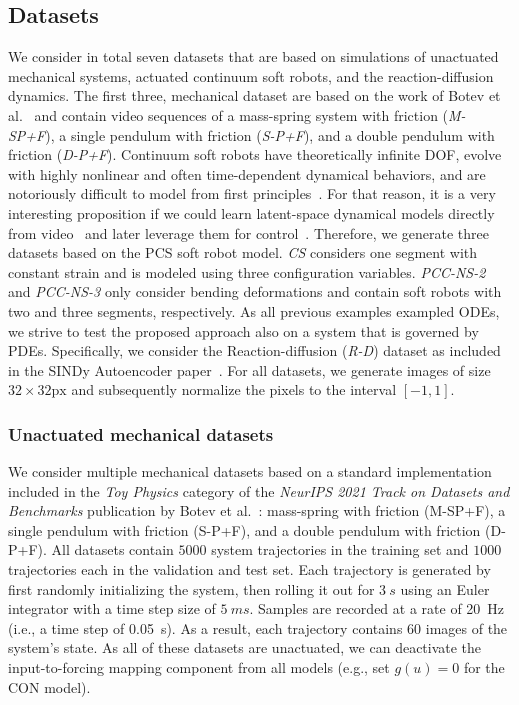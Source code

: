 \subsection{Datasets} 
We consider in total seven datasets that are based on simulations of unactuated mechanical systems, actuated continuum soft robots, and the reaction-diffusion dynamics. The first three, mechanical dataset are based on the work of Botev et al.~\cite{botev2021priors} and contain video sequences of a mass-spring system with friction (\emph{M-SP+F}), a single pendulum with friction (\emph{S-P+F}), and a double pendulum with friction (\emph{D-P+F}).
Continuum soft robots have theoretically infinite \gls{DOF}, evolve with highly nonlinear and often time-dependent dynamical behaviors, and are notoriously difficult to model from first principles~\cite{armanini2023soft}. For that reason, it is a very interesting proposition if we could learn latent-space dynamical models directly from video~\cite{thuruthel2023multi} and later leverage them for control~\cite{almanzor2023static}. 
Therefore, we generate three datasets based on the \gls{PCS} soft robot model. \emph{CS} considers one segment with constant strain and is modeled using three configuration variables. \emph{PCC-NS-2} and \emph{PCC-NS-3} only consider bending deformations and contain soft robots with two and three segments, respectively. 
As all previous examples exampled \glspl{ODE}, we strive to test the proposed approach also on a system that is governed by \glspl{PDE}. Specifically, we consider the Reaction-diffusion (\emph{R-D}) dataset as included in the SINDy Autoencoder paper~\cite{champion2019data}.
For all datasets, we generate images of size $32 \times 32 \mathrm{px}$ and subsequently normalize the pixels to the interval $[-1, 1]$. 

\subsubsection{Unactuated mechanical datasets}
We consider multiple mechanical datasets based on a standard implementation included in the \emph{Toy Physics} category of the \emph{NeurIPS 2021 Track on Datasets and Benchmarks} publication by Botev et al.~\cite{botev2021priors}:  mass-spring with friction (M-SP+F), a single pendulum with friction (S-P+F), and a double pendulum with friction (D-P+F).
All datasets contain $5000$ system trajectories in the training set and $1000$ trajectories each in the validation and test set.
Each trajectory is generated by first randomly initializing the system, then rolling it out for $\SI{3}{s}$ using an Euler integrator with a time step size of $\SI{5}{ms}$. Samples are recorded at a rate of \SI{20}{Hz}  (i.e., a time step of \SI{0.05}{s}). As a result, each trajectory contains $60$ images of the system's state.
As all of these datasets are unactuated, we can deactivate the input-to-forcing mapping component from all models (e.g., set $g(u) = 0$ for the \gls{CON} model).

